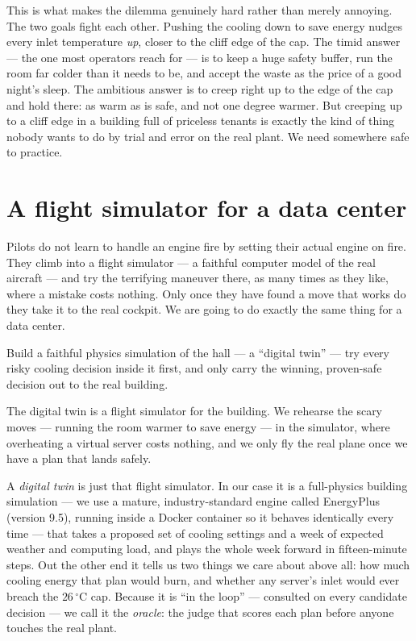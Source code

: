 This is what makes the dilemma genuinely hard rather than merely annoying. The two goals fight each other. Pushing the cooling down to save energy nudges every inlet temperature \emph{up}, closer to the cliff edge of the cap. The timid answer --- the one most operators reach for --- is to keep a huge safety buffer, run the room far colder than it needs to be, and accept the waste as the price of a good night's sleep. The ambitious answer is to creep right up to the edge of the cap and hold there: as warm as is safe, and not one degree warmer. But creeping up to a cliff edge in a building full of priceless tenants is exactly the kind of thing nobody wants to do by trial and error on the real plant. We need somewhere safe to practice.

\section{A flight simulator for a data center}

Pilots do not learn to handle an engine fire by setting their actual engine on fire. They climb into a flight simulator --- a faithful computer model of the real aircraft --- and try the terrifying maneuver there, as many times as they like, where a mistake costs nothing. Only once they have found a move that works do they take it to the real cockpit. We are going to do exactly the same thing for a data center.

\begin{keyidea}
Build a faithful physics simulation of the hall --- a ``digital twin'' --- try every risky cooling decision inside it first, and only carry the winning, proven-safe decision out to the real building.
\end{keyidea}

\begin{analogy}
The digital twin is a flight simulator for the building. We rehearse the scary moves --- running the room warmer to save energy --- in the simulator, where overheating a virtual server costs nothing, and we only fly the real plane once we have a plan that lands safely.
\end{analogy}

A \emph{digital twin} is just that flight simulator. In our case it is a full-physics building simulation --- we use a mature, industry-standard engine called EnergyPlus (version 9.5), running inside a Docker container so it behaves identically every time --- that takes a proposed set of cooling settings and a week of expected weather and computing load, and plays the whole week forward in fifteen-minute steps. Out the other end it tells us two things we care about above all: how much cooling energy that plan would burn, and whether any server's inlet would ever breach the $26\,^\circ\mathrm{C}$ cap. Because it is ``in the loop'' --- consulted on every candidate decision --- we call it the \emph{oracle}: the judge that scores each plan before anyone touches the real plant.

